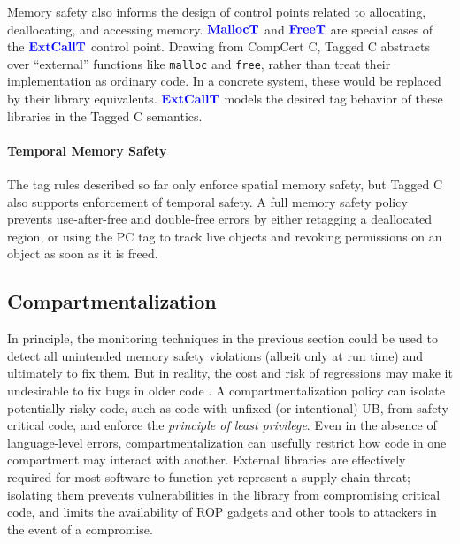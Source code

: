\documentclass{llncs}
\begin{document}
Memory safety also informs the design of control points related to allocating, deallocating, and
accessing memory. \(\color{blue} \mathbf{MallocT}\) and \(\color{blue} \mathbf{FreeT}\) are special cases of the
\(\color{blue} \mathbf{ExtCallT}\) control point. Drawing from CompCert C, Tagged C abstracts over
``external'' functions like {\tt malloc} and {\tt free}, rather than treat their implementation as
ordinary code. In a concrete system, these would be replaced by their library equivalents.
\(\color{blue} \mathbf{ExtCallT}\) models the desired tag behavior of these libraries in the Tagged C semantics.

\paragraph*{Temporal Memory Safety}

The tag rules described so far only enforce spatial memory safety, but Tagged C also
supports enforcement of temporal safety. A full memory safety policy prevents use-after-free and
double-free errors by either retagging a deallocated region, or using the PC tag
to track live objects and revoking permissions on an object as soon as it is freed.

\subsection{Compartmentalization}
\label{sec:compartments}

In principle, the monitoring techniques in the previous section could be used
to detect all unintended memory safety violations (albeit only at run time) and ultimately to fix them.
But in reality, the cost and risk of regressions may make it
undesirable to fix bugs in older code \cite{Bessey10:Coverity}.  
%
A compartmentalization policy can isolate potentially risky code, such as code with unfixed
(or intentional) UB, from safety-critical code, and enforce the {\em principle of least privilege}. 
Even in the absence of language-level errors, compartmentalization can usefully 
restrict how code in one compartment may interact with another. External libraries are
effectively required for most software to function yet represent a supply-chain threat; isolating 
them prevents vulnerabilities in the library from compromising critical code,
and limits the availability of ROP gadgets and other tools to attackers in the event of a compromise.
\end{document}
